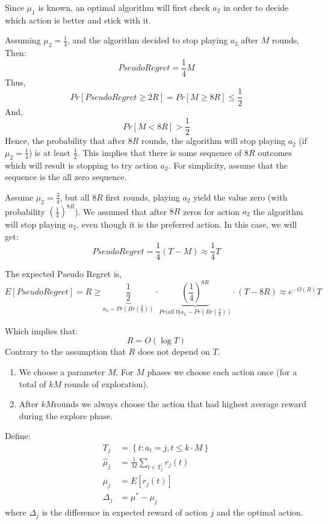 Since $\mu_1$ is known, an optimal algorithm will first check $a_2$
in order to decide which action is better and stick with it.

Assuming $\mu_2 = \frac{1}{4}$, and the algorithm decided to stop
playing $a_2$ after $M$ rounds, Then:
\[
Pseudo Regret = \frac{1}{4}M
\]
Thus,
\[
Pr\left[Pseudo Regret\ge 2R \right] = Pr\left[ M\ge 8R
\right]\le\frac{1}{2}
\]
And,
\[
Pr\left[M < 8R \right]>\frac{1}{2}
\]
Hence, the probability that after $8R$ rounds, the algorithm will
stop playing $a_2$ (if $\mu_2 = \frac{1}{4}$) is at least
$\frac{1}{2}$. This implies that there is some sequence of $8R$
outcomes which will result is stopping to try action $a_2$. For
simplicity, assume that the sequence is the all zero sequence.

Assume $\mu_2 = \frac{3}{4}$, but all $8R$ first rounds, playing
$a_2$ yield the value zero (with probability
$\left(\frac{1}{4}\right)^{8R}$). We assumed that after $8R$ zeros
for action $a_2$ the algorithm will stop playing $a_2$, even though
it is the preferred action. In this case, we will get:
\[
Pseudo Regret = \frac{1}{4} (T - M) \approx \frac{1}{4}T
\]

The expected Pseudo Regret is,
\[
E\left[Pseudo Regret\right] = R \geq
\underbrace{\frac{1}{2}}_{a_{2}\sim Pr(Br\left(\frac{3}{4}\right))}
\cdot \underbrace{\left(\frac{1}{4}\right)^{8R}}_{Pr(all \; 0 |
a_{2}\sim Pr(Br\left(\frac{3}{4}\right))} \cdot (T - 8R) \approx
e^{-O(R)}T
\]

Which implies that:
\[
R=O\left(\log T\right)
\]
Contrary to the assumption that $R$ does not depend on $T$.


\begin{enumerate}
%
\item We choose a parameter $M$.
%
For $M$ phases we choose each action once (for a total of $kM$
rounds of exploration).
%
\item After $kM$rounds we always choose the action that had highest
average reward during the explore phase.
\end{enumerate}

Define:
\begin{align*}
T_{j}&= \left\{ t:a_t=j,t\le k\cdot M\right\}\\
\hat{\mu}_{j}&=\frac{1}{M} \sum_{t\in T_{j}}r_{j}(t)\\
\mu_{j}&=E[r_{j}(t)]\\
\Delta_{j}&=\mu^{*}-\mu_{j}
\end{align*}
where $\Delta_j$ is the difference in expected reward of action $j$
and the optimal action.

